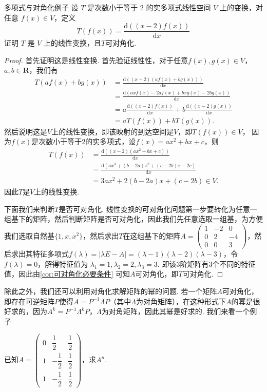 \begin{example}{}{多项式与对角化例子}
    设 $T$ 是次数小于等于 2 的实多项式线性空间 $V$ 上的变换，对任意 $f(x) \in V$，定义
    \[T(f(x))=\frac{\mathrm{d}((x-2)f(x))}{\mathrm{d}x}\]
    证明 $T$ 是 $V$ 上的线性变换，且$T$可对角化.
\end{example}

\begin{proof}
    首先证明这是线性变换. 首先验证线性性，对于任意$f(x),g(x)\in V$，$a,b\in\mathbf{R}$，我们有
    \begin{align*}
        T(af(x)+bg(x)) & =\frac{\mathrm{d}((x-2)(af(x)+bg(x)))}{\mathrm{d}x}                                    \\
                       & =\frac{\mathrm{d}(axf(x)-2af(x)+bxg(x)-2bg(x))}{\mathrm{d}x}                           \\
                       & =a\frac{\mathrm{d}((x-2)f(x))}{\mathrm{d}x}+b\frac{\mathrm{d}((x-2)g(x))}{\mathrm{d}x} \\
                       & =aT(f(x))+bT(g(x)).
    \end{align*}
    然后说明这是$V$上的线性变换，即该映射的到达空间是$V$，即$T(f(x))\in V$， 因为$f(x)$是次数小于等于2的实多项式，设$f(x)=ax^2+bx+c$，则
    \begin{align*}
        T(f(x)) & =\frac{\mathrm{d}((x-2)(ax^2+bx+c))}{\mathrm{d}x}          \\
                & =\frac{\mathrm{d}(ax^3+(b-2a)x^2+(c-2b)x-2c)}{\mathrm{d}x} \\
                & =3ax^2+2(b-2a)x+(c-2b)\in V.
    \end{align*}
    因此$T$是$V$上的线性变换.

    下面我们来判断$T$是否可对角化. 线性变换的可对角化问题第一步要转化为任意一组基下的矩阵，然后判断矩阵是否可对角化，因此我们先任意选取一组基，为方便我们选取自然基$\{1,x,x^2\}$，然后求出$T$在这组基下的矩阵$A=\begin{pmatrix}
            1 & -2 & 0 \\ 0 & 2 & -4 \\ 0 & 0 & 3
        \end{pmatrix}$，然后求出其特征多项式$f(\lambda)=|\lambda E-A|=(\lambda-1)(\lambda-2)(\lambda-3)$，令$f(\lambda)=0$，解得特征值为 $\lambda_1=1,\lambda_2=2,\lambda_3=3$. 即该3阶矩阵有3个不同的特征值，因此由\autoref{cor:可对角化必要条件} 可知$A$可对角化，即$T$可对角化.
\end{proof}

除此之外，我们还可以利用对角化求解矩阵的幂的问题. 若一个矩阵$A$可对角化，即存在可逆矩阵$P$使得$A=P^{-1}\varLambda P$（其中$\varLambda$为对角矩阵），在这种形式下$A$的幂是很好求的，因为$A^k=P^{-1}\varLambda^kP$，$\varLambda$为对角矩阵，因此其幂是好求的. 我们来看一个例子
\begin{example}{}{}
    已知$A=\begin{pmatrix}
            0 & \dfrac{1}{2}  & \dfrac{1}{2} \\[2ex]
            1 & -\dfrac{1}{2} & \dfrac{1}{2} \\[2ex]
            1 & -\dfrac{1}{2} & \dfrac{1}{2}
        \end{pmatrix}$，求$A^n$.
\end{example}

